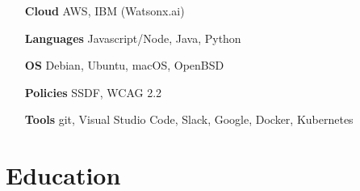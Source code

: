 \documentclass[letterpaper,10pt]{article}
\begin{document}
    \begin{multicols}{2}
        \begin{itemize}[itemsep=-2px, parsep=1pt, leftmargin=75pt]
        \item[\textbf{Cloud}] AWS, IBM (Watsonx.ai)
        \item[\textbf{Languages}] Javascript/Node, Java, Python
        \item[\textbf{OS}] Debian, Ubuntu, macOS, OpenBSD
        \item[\textbf{Policies}] SSDF, WCAG 2.2
        \item[\textbf{Tools}] git, Visual Studio Code, Slack, Google, Docker, Kubernetes 
        \end{itemize}
    \end{multicols}
  

  \section{Education}



\end{document}
